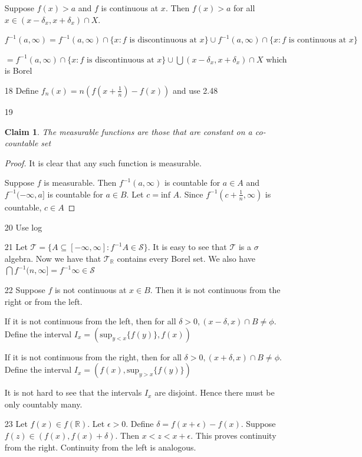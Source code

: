 \documentclass{article}
\newtheorem*{claim}{Claim}
\begin{document}
\begin{enumerate}
    Suppose $f(x) > a$ and $f$ is continuous at $x$. Then $f(x)>a$ for all $x \in (x-\delta_x,x+\delta_x)\cap X$.

    $f^{-1}(a,\infty)=f^{-1}(a,\infty)\cap\{x : f \text{ is discontinuous at }x\}\cup f^{-1}(a,\infty)\cap\{x : f \text{ is continuous at }x\}$
    
    $=f^{-1}(a,\infty)\cap\{x : f \text{ is discontinuous at }x\}\cup \bigcup (x-\delta_x,x+\delta_x)\cap X$ which is Borel

    \item[18]
    Define $f_n(x)=n(f(x+\frac{1}{n})-f(x))$ and use 2.48
    \item[19] 
    \begin{claim}
    The measurable functions are those that are constant on a co-countable set
    \end{claim}

    \begin{proof}
    It is clear that any such function is measurable.

    Suppose $f$ is measurable. Then $f^{-1}(a,\infty)$ is countable for $a \in A$ and $f^{-1}(-\infty,a]$ is countable for $a \in B$. Let $c = \text{inf } A$. Since $f^{-1}(c+\frac{1}{n},\infty)$ is countable, $c \in A$
    \end{proof}

    \item [20]
    Use log
    \item [21]
    Let $\mathcal{T}=\{A \subseteq [-\infty,\infty]:f^{-1}A \in \mathcal{S}\}$. It is easy to see that $\mathcal{T}$ is a $\sigma$ algebra. Now we have that $\mathcal{T}_\mathbb{R}$ contains every Borel set. We also have $\bigcap f^{-1}(n,\infty]=f^{-1}{\infty} \in \mathcal{S}$

    \item[22]
    Suppose $f$ is not continuous at $x \in B$. Then it is not continuous from the right or from the left.

    If it is not continuous from the left, then for all $\delta > 0,(x-\delta,x)\cap B \neq \phi$. Define the interval $I_x = (\text{sup}_{y<x}\{f(y)\},f(x))$

  If it is not continuous from the right, then for all $\delta > 0,(x+\delta,x)\cap B \neq \phi$. Define the interval $I_x = (f(x),\text{sup}_{y>x}\{f(y)\})$

  It is not hard to see that the intervals $I_x$ are disjoint. Hence there must be only countably many.

  \item[23]
  Let $f(x) \in f(\mathbb{R})$. Let $\epsilon > 0$. Define $\delta = f(x+\epsilon)-f(x)$. Suppose $f(z) \in (f(x),f(x)+\delta)$. Then $x<z<x+\epsilon$. This proves continuity from the right. Continuity from the left is analogous.


\end{enumerate}
\end{document}
